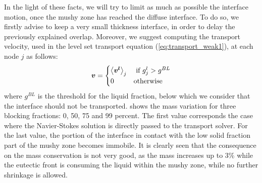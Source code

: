 In the light of these facts, we will try to limit as much as possible the interface motion, once the mushy zone has reached the diffuse interface.
To do so, we firstly advise to keep a very small thickness interface, in order to delay the previously explained overlap. Moreover, we suggest computing the 
transport velocity, used in the level set transport equation (\cref{eq:transport_weak1}), at each node $j$ as follows:
\begin{align}
\label{eq:}
\boldsymbol{v} =
\begin{cases}
  \left \langle \boldsymbol{v^l} \right \rangle_j 	& \text{ if } g^l_j > g^{BL} \\
  0 		& \text{otherwise}
\end{cases}
\end{align}
where $g^{BL}$ is the threshold for the liquid fraction, below which we consider that the interface should not be transported.
 shows the mass variation for three blocking fractions: 0, 50, 75 and 99 percent.
The first value corresponds the case where the Navier-Stokes solution is directly passed to the transport solver.
For the last value, the portion of the interface in contact with the low solid fraction part
of the mushy zone becomes immobile. It is clearly seen that the consequence on the mass conservation is not very good, as 
the mass increases up to 3\% while the eutectic front is consuming the liquid within the mushy zone, while no further shrinkage is allowed.

